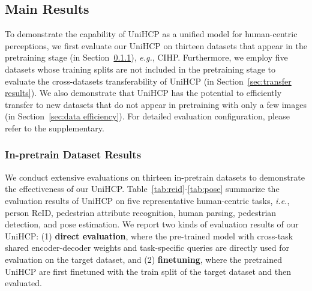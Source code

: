 \documentclass[10pt,twocolumn,letterpaper]{article}
\begin{document}
\subsection{Main Results}
To demonstrate the capability of UniHCP as a unified model for human-centric perceptions, we first evaluate our UniHCP on thirteen datasets that appear in the pretraining stage (in Section~\ref{sec:in pretrain task}), \emph{e.g.}, CIHP. Furthermore, we employ five datasets whose training splits are not included in the pretraining stage to evaluate the cross-datasets transferability of UniHCP (in Section~\ref{sec:transfer results}). We also demonstrate that UniHCP has the potential to efficiently transfer to new datasets that do not appear in pretraining with only a few images (in Section~\ref{sec:data efficiency}). For detailed evaluation configuration, please refer to the supplementary.



\subsubsection{In-pretrain Dataset Results}
\label{sec:in pretrain task}
We conduct extensive evaluations on thirteen in-pretrain datasets to demonstrate the effectiveness of our UniHCP. 
Table~\ref{tab:reid}-\ref{tab:pose} summarize the evaluation results of UniHCP on five representative human-centric tasks, \emph{i.e.}, person ReID, pedestrian attribute recognition, human parsing, pedestrian detection, and pose estimation. We report two kinds of evaluation results of our UniHCP: (1) \textbf{direct evaluation}, where the pre-trained model with cross-task shared encoder-decoder weights and task-specific queries are directly used for evaluation on the target dataset, and (2) \textbf{finetuning}, where the pretrained UniHCP are first finetuned with the train split of the target dataset and then evaluated.  
\end{document}
